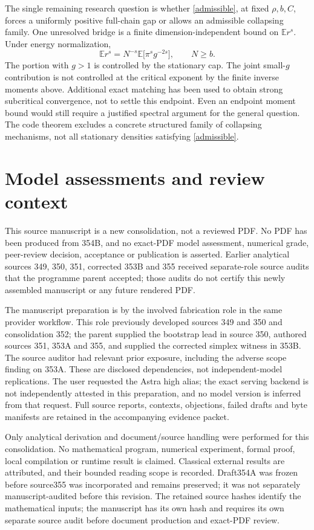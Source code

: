 \documentclass[11pt]{article}
\newcommand{\E}{\mathbb E}
\begin{document}
The single remaining research question is whether \eqref{admissible}, at fixed $\rho,b,C$, forces a uniformly positive full-chain gap or allows an admissible collapsing family. One unresolved bridge is a finite dimension-independent bound on $\E r^s$. Under energy normalization,
\[
 \E r^s=N^{-s}\E\bigl[\pi^s g^{-2s}\bigr],\qquad N\geq b.
\]
The portion with $g>1$ is controlled by the stationary cap. The joint small-$g$ contribution is not controlled at the critical exponent by the finite inverse moments above. Additional exact matching has been used to obtain strong subcritical convergence, not to settle this endpoint. Even an endpoint moment bound would still require a justified spectral argument for the general question. The code theorem excludes a concrete structured family of collapsing mechanisms, not all stationary densities satisfying \eqref{admissible}.

\section{Model assessments and review context}
This source manuscript is a new consolidation, not a reviewed PDF. No PDF has been produced from 354B, and no exact-PDF model assessment, numerical grade, peer-review decision, acceptance or publication is asserted. Earlier analytical sources 349, 350, 351, corrected 353B and 355 received separate-role source audits that the programme parent accepted; those audits do not certify this newly assembled manuscript or any future rendered PDF.

The manuscript preparation is by the involved fabrication role in the same provider workflow. This role previously developed sources 349 and 350 and consolidation 352; the parent supplied the bootstrap lead in source 350, authored sources 351, 353A and 355, and supplied the corrected simplex witness in 353B. The source auditor had relevant prior exposure, including the adverse scope finding on 353A. These are disclosed dependencies, not independent-model replications. The user requested the Astra high alias; the exact serving backend is not independently attested in this preparation, and no model version is inferred from that request. Full source reports, contexts, objections, failed drafts and byte manifests are retained in the accompanying evidence packet.

Only analytical derivation and document/source handling were performed for this consolidation. No mathematical program, numerical experiment, formal proof, local compilation or runtime result is claimed. Classical external results are attributed, and their bounded reading scope is recorded. Draft354A was frozen before source355 was incorporated and remains preserved; it was not separately manuscript-audited before this revision. The retained source hashes identify the mathematical inputs; the manuscript has its own hash and requires its own separate source audit before document production and exact-PDF review.
\end{document}
